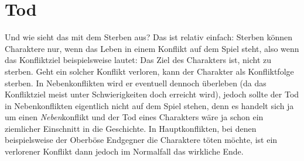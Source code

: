 \section{Tod}

Und wie sieht das mit dem Sterben aus? Das ist relativ einfach: Sterben können Charaktere nur, wenn das Leben in einem Konflikt auf dem Spiel steht, also wenn das Konfliktziel beispielsweise lautet: Das Ziel des Charakters ist, nicht zu sterben. Geht ein solcher Konflikt verloren, kann der Charakter als Konfliktfolge sterben. In Nebenkonflikten wird er eventuell dennoch überleben (da das Konfliktziel meist unter Schwierigkeiten doch erreicht wird), jedoch sollte der Tod in Nebenkonflikten eigentlich nicht auf dem Spiel stehen, denn es handelt sich ja um einen \emph{Neben}konflikt und der Tod eines Charakters wäre ja schon ein ziemlicher Einschnitt in die Geschichte. In Hauptkonflikten, bei denen beispielsweise der Oberböse Endgegner die Charaktere töten möchte, ist ein verlorener Konflikt dann jedoch im Normalfall das wirkliche Ende.



